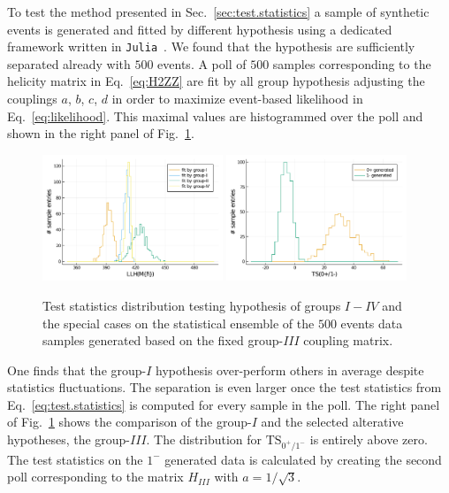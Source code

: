 \documentclass[prd,preprintnumbers,floatfix,
nofootinbib,superscriptaddress]{revtex4}
\newcommand{\TS}{\mathrm{TS}}
\newcommand{\I}{\ensuremath{I}}
\newcommand{\III}{\ensuremath{{I\!I\!I}}}
\newcommand{\IV}{\ensuremath{{I\!V}}}
\begin{document}
To test the method presented in Sec.~\ref{sec:test.statistics} a sample of synthetic events
is generated and fitted by different hypothesis using a dedicated framework written in \texttt{Julia}~\cite{julia.JpsiJpsi}.
We found that the hypothesis are sufficiently separated already with $500$ events. %
A poll of $500$ samples corresponding to the helicity matrix in Eq.~\eqref{eq:H2ZZ} are fit by all group hypothesis
adjusting the couplings $a$, $b$, $c$, $d$ in order to maximize event-based likelihood in Eq.~\eqref{eq:likelihood}.
This maximal values are histogrammed over the poll and shown in the right panel of Fig.~\ref{fig:TS.fixedH}.
\begin{figure}
  \includegraphics[width=0.48\textwidth]{../plots/llh_testing_higgs.pdf}
  \includegraphics[width=0.48\textwidth]{../plots/TS_0p_vs_1m.pdf}
  \caption{Test statistics distribution testing hypothesis of groups $\I-\IV$ and the special cases on the statistical ensemble of the $500$ events data samples generated based on
  the fixed group-$\III$ coupling matrix. }
  \label{fig:TS.fixedH}
\end{figure}
One finds that the group-$\I$ hypothesis over-perform others in average despite statistics fluctuations.
The separation is even larger once the test statistics from Eq.~\eqref{eq:test.statistics} is computed for every sample in the poll.
The right panel of Fig.~\ref{fig:TS.fixedH} shows the comparison of the group-$\I$ and the selected alterative hypotheses, the group-$\III$.
The distribution for $\TS_{0^+/1^-}$ is entirely above zero.
The test statistics on the $1^-$ generated data is calculated by creating the second poll corresponding to the matrix $H_\III$ with $a = 1/\sqrt{3}$.
\end{document}
